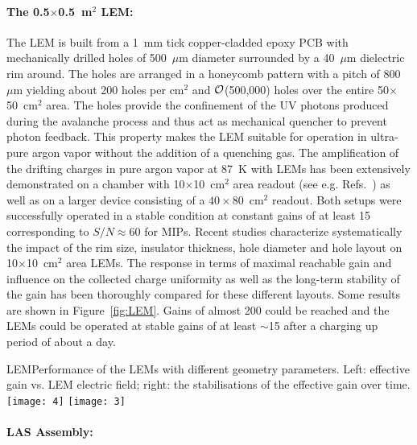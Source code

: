 \paragraph{The 0.5$\times$0.5~m$^2$ LEM:}
The LEM is built from a 1~mm tick copper-cladded epoxy PCB with
mechanically drilled holes of 500~$\mu$m diameter surrounded by a
40~$\mu$m dielectric rim around. The holes are arranged in a honeycomb
pattern with a pitch of 800~$\mu$m yielding about 200 holes per cm$^2$
and $\cal O$(500,000) holes over the entire 50$\times$50~cm$^2$
area. The holes provide the confinement of the UV photons produced
during the avalanche process and thus act as mechanical quencher to
prevent photon feedback. This property makes the LEM suitable for
operation in ultra-pure argon vapor without the addition of a
quenching gas. The amplification of the drifting charges in pure argon
vapor at 87~K with LEMs has been extensively demonstrated on a chamber
with 10$\times$10~cm$^2$ area readout (see e.g.
Refs.~\cite{Badertscher:2008rf,Badertscher:2010fi}) as well as on a
larger device consisting of a $40\times80$~cm$^2$
readout\cite{Badertscher:2013wm}.  Both setups were successfully
operated in a stable condition at constant gains of at least 15
corresponding to $S/N\approx 60$ for MIPs. Recent
studies\cite{Cantini:2014xza} characterize systematically the impact
of the rim size, insulator thickness, hole diameter and hole layout on
10$\times$10~cm$^2$ area LEMs. The response in terms of maximal
reachable gain and influence on the collected charge uniformity as
well as the long-term stability of the gain has been thoroughly
compared for these different layouts. Some results are shown in
Figure~\ref{fig:LEM}.  Gains of almost 200 could be reached and the
LEMs could be operated at stable gains of at least $\sim$15 after a
charging up period of about a day.
\begin{cdrfigure}{LEM}{Performance of the LEMs with different geometry parameters. Left: effective gain vs. LEM electric field; right: the stabilisations of the effective gain over time.}
\texttt{[image: 4]}
\texttt{[image: 3]}
\end{cdrfigure}

\paragraph{LAS Assembly:}

